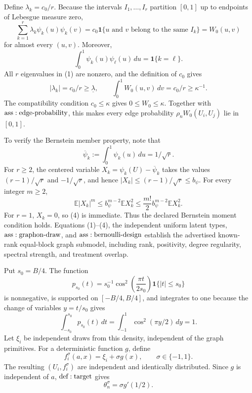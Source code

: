 Define \(\lambda_k=c_0/r\).  Because the intervals \(I_1,\ldots,I_r\) partition \([0,1]\) up to endpoints of Lebesgue measure zero,
\[
 \sum_{k=1}^r\lambda_k\psi_k(u)\psi_k(v)
 =c_0\mathbf1\{u\text{ and }v\text{ belong to the same }I_k\}
 =W_0(u,v)
\tag{1}
\]
for almost every \((u,v)\).  Moreover,
\[
 \int_0^1\psi_k(u)\psi_\ell(u)\,du=\mathbf1\{k=\ell\}.
\tag{2}
\]
All \(r\) eigenvalues in (1) are nonzero, and the definition of \(c_0\) gives
\[
 |\lambda_k|=c_0/r\geq\underline\lambda,\qquad
 \int_0^1W_0(u,v)\,dv=c_0/r\geq\kappa^{-1}.
\tag{3}
\]
The compatibility condition \(c_0\leq\kappa\) gives \(0\leq W_0\leq\kappa\).  Together with \({\rm ass:edge\text{-}probability}\), this makes every edge probability \(\rho_nW_0(U_i,U_j)\) lie in \([0,1]\).

To verify the Bernstein member property, note that
\[
 \overline\psi_k:=\int_0^1\psi_k(u)\,du=1/\sqrt r.
\]
For \(r\geq2\), the centered variable \(X_k=\psi_k(U)-\overline\psi_k\) takes the values \((r-1)/\sqrt r\) and \(-1/\sqrt r\), and hence \(|X_k|\leq(r-1)/\sqrt r\leq b_\psi\).  For every integer \(m\geq2\),
\[
 \mathbb E|X_k|^m
 \leq b_\psi^{m-2}\mathbb EX_k^2
 \leq\frac{m!}{2}b_\psi^{m-2}\mathbb EX_k^2.
\tag{4}
\]
For \(r=1\), \(X_k=0\), so (4) is immediate.  Thus the declared Bernstein moment condition holds.  Equations (1)--(4), the independent uniform latent types, \({\rm ass:graphon\text{-}draw}\), and \({\rm ass:bernoulli\text{-}design}\) establish the advertised known-rank equal-block graph submodel, including rank, positivity, degree regularity, spectral strength, and treatment overlap.

Put \(s_0=B/4\).  The function
\[
 p_{s_0}(t)=s_0^{-1}\cos^2\!\left(\frac{\pi t}{2s_0}\right)
 \mathbf1\{|t|\leq s_0\}
\tag{5}
\]
is nonnegative, is supported on \([-B/4,B/4]\), and integrates to one because the change of variables \(y=t/s_0\) gives
\[
 \int_{-s_0}^{s_0}p_{s_0}(t)\,dt
 =\int_{-1}^{1}\cos^2(\pi y/2)\,dy=1.
\tag{6}
\]
Let \(\xi_i\) be independent draws from this density, independent of the graph primitives.  For a deterministic function \(g\), define
\[
 f_i^\sigma(a,x)=\xi_i+\sigma g(x),\qquad \sigma\in\{-1,1\}.
\tag{7}
\]
The resulting \((U_i,f_i^\sigma)\) are independent and identically distributed.  Since \(g\) is independent of \(a\), \({\rm def:target}\) gives
\[
 \theta_n^\sigma=\sigma g'(1/2).
\tag{8}
\]

